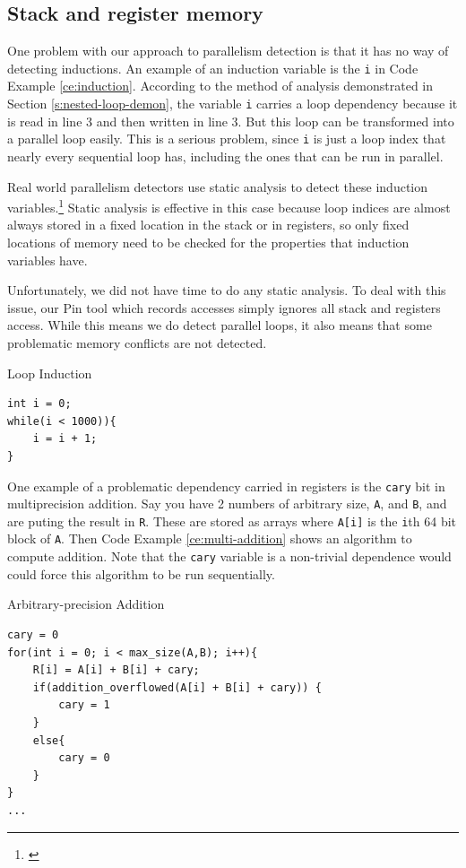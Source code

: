 \documentclass[12pt,twoside]{reedthesis}
\newenvironment{codeexample}[1][htb]
{\floatname{algorithm}{Code Example}%
	\begin{algorithm}[#1]%
	}{\end{algorithm}}
\begin{document}
		\subsection{Stack and register memory}
		\label{s:stack-reg-con}
		
		One problem with our approach to parallelism detection is that it has no way of detecting inductions. An example of an induction variable is the \texttt{i} in Code Example \ref{ce:induction}. According to the method of analysis demonstrated in Section \ref{s:nested-loop-demon}, the variable \texttt{i} carries a loop dependency because it is read in line 3 and then written in line 3. But this loop can be transformed into a parallel loop easily. This is a serious problem, since \texttt{i} is just a loop index that nearly every sequential loop has, including the ones that can be run in parallel. 
		
		Real world parallelism detectors use static analysis to detect these induction variables.\footnote{\cite{Kim:2010}} Static analysis is effective in this case because loop indices are almost always stored in a fixed location in the stack or in registers, so only fixed locations of memory need to be checked for the properties that induction variables have.
		
		Unfortunately, we did not have time to do any static analysis. To deal with this issue, our Pin tool which records accesses simply ignores all stack and registers access. While this means we do detect parallel loops, it also means that some problematic memory conflicts are not detected. 

\begin{codeexample}
	\caption{Loop Induction}
	\label{ce:induction}
\begin{lstlisting}
int i = 0;
while(i < 1000)){
	i = i + 1;
}
\end{lstlisting}
\end{codeexample}
		
		One example of a problematic dependency carried in registers is the \texttt{cary} bit in multiprecision addition.
		Say you have 2 numbers of arbitrary size, \texttt{A}, and \texttt{B}, and are puting the result in \texttt{R}. These are stored as arrays where \texttt{A[i]} is the \texttt{i}th 64 bit block of \texttt{A}. Then Code Example \ref{ce:multi-addition} shows an algorithm to compute addition. Note that the \texttt{cary} variable is a non-trivial dependence would could force this algorithm to be run sequentially. 

\begin{codeexample}
	\caption{Arbitrary-precision Addition}
	\label{ce:multi-addition}
\begin{lstlisting}
cary = 0
for(int i = 0; i < max_size(A,B); i++){
	R[i] = A[i] + B[i] + cary;
	if(addition_overflowed(A[i] + B[i] + cary)) {
		cary = 1
	}
	else{
		cary = 0
	}
}
...
\end{lstlisting}
\end{codeexample}	
	
\end{document}

